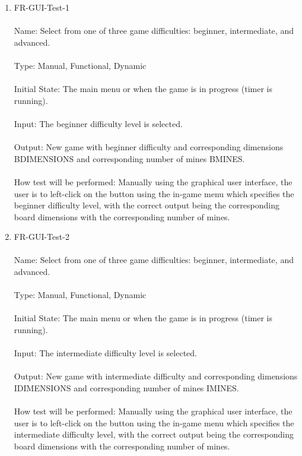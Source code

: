 \documentclass[12pt, titlepage]{article}
\begin{document}
\begin{enumerate}
\item{FR-GUI-Test-1\\\\}
Name: Select from one of three game difficulties: beginner, intermediate, and advanced.\\\\
Type: Manual, Functional, Dynamic\\\\
Initial State: The main menu or when the game is in progress (timer is running).\\\\
Input: The beginner difficulty level is selected.\\\\
Output: New game with beginner difficulty and corresponding dimensions BDIMENSIONS and corresponding number of mines BMINES.\\\\
How test will be performed: Manually using the graphical user interface, the user is to left-click on the button using the in-game menu which specifies the beginner difficulty level, with the correct output being the corresponding board dimensions with the corresponding number of mines.\\

\item{FR-GUI-Test-2\\\\}
Name: Select from one of three game difficulties: beginner, intermediate, and advanced.\\\\
Type: Manual, Functional, Dynamic\\\\
Initial State: The main menu or when the game is in progress (timer is running).\\\\
Input: The intermediate difficulty level is selected.\\\\
Output: New game with intermediate difficulty and corresponding dimensions IDIMENSIONS and corresponding number of mines IMINES.\\\\
How test will be performed: Manually using the graphical user interface, the user is to left-click on the button using the in-game menu which specifies the intermediate difficulty level, with the correct output being the corresponding board dimensions with the corresponding number of mines.\\


\end{enumerate}
\end{document}
